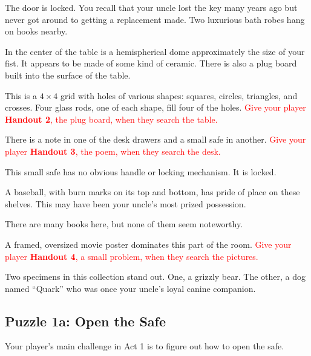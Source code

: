 \documentclass[a6paper, parskip=half, DIV=14, 12pt]{scrartcl}
\begin{document}
\begin{description}[leftmargin=0pt]
\item[Door (E)] The door is locked. You recall that your uncle lost the key many years ago but never got around to getting a replacement made. Two luxurious bath robes hang on hooks nearby.%
\item[Table (C)] In the center of the table is a hemispherical dome approximately the size of your fist. It appears to be made of some kind of ceramic.
There is also a plug board built into the surface of the table.
\item[Plug Board (C)] This is a $4 \times 4$ grid with holes of various shapes: squares, circles, triangles, and crosses. Four glass rods, one of each shape, fill four of the holes. \textcolor{Red}{Give your player \textbf{Handout 2}, the plug board, when they search the table.}
\item[Desk (W)] There is a note in one of the desk drawers and a small safe in another. \textcolor{Red}{Give your player \textbf{Handout 3}, the poem, when they search the desk.}
\item[Safe (W)] This small safe has no obvious handle or locking mechanism. It is locked.
\item[Shelves (NW)] A baseball, with burn marks on its top and bottom, has pride of place on these shelves. This may have been your uncle's most prized possession.
\item[Bookcases (NE)] There are many books here, but none of them seem noteworthy.
\item[Pictures (SE)] A framed, oversized movie poster dominates this part of the room. \textcolor{Red}{Give your player \textbf{Handout 4}, a small problem, when they search the pictures.}
\item[Animals (SW)] Two specimens in this collection stand out. One, a grizzly bear. The other, a dog named ``Quark'' who was once your uncle's loyal canine companion.
\end{description}

\subsection*{Puzzle 1a: Open the Safe}
Your player's main challenge in Act 1 is to figure out how to open the safe.
\end{document}
